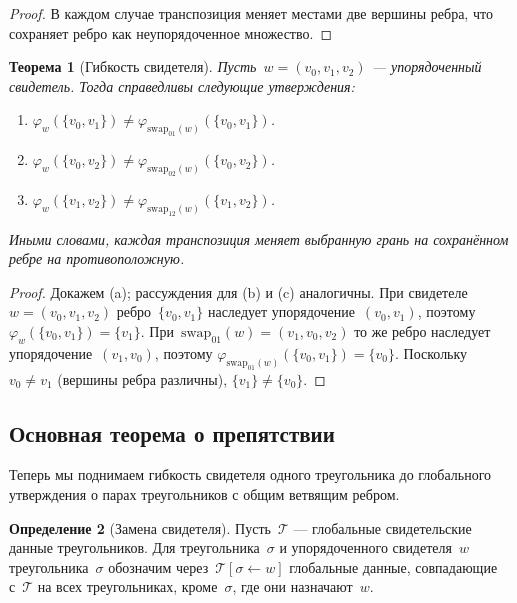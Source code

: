 \documentclass[11pt,a4paper]{article}
\theoremstyle{plain}
\newtheorem{theorem}{Теорема}[section]
\theoremstyle{definition}
\newtheorem{definition}[theorem]{Определение}
\theoremstyle{remark}
\newcommand{\cT}{\mathcal{T}}
\newcommand{\swapAB}{\mathrm{swap}_{01}}
\newcommand{\swapAC}{\mathrm{swap}_{02}}
\newcommand{\swapBC}{\mathrm{swap}_{12}}
\newcommand{\chosenface}{\varphi}
\begin{document}
\begin{proof}
В каждом случае транспозиция меняет местами две вершины ребра, что
сохраняет ребро как неупорядоченное множество.
\end{proof}

\begin{theorem}[Гибкость свидетеля]
\label{thm:flexibility}
Пусть~$w = (v_0, v_1, v_2)$ --- упорядоченный свидетель. Тогда
справедливы следующие утверждения:
\begin{enumerate}[label=\textup{(\alph*)},nosep]
  \item $\chosenface_w(\{v_0, v_1\}) \neq
        \chosenface_{\swapAB(w)}(\{v_0, v_1\})$.
  \item $\chosenface_w(\{v_0, v_2\}) \neq
        \chosenface_{\swapAC(w)}(\{v_0, v_2\})$.
  \item $\chosenface_w(\{v_1, v_2\}) \neq
        \chosenface_{\swapBC(w)}(\{v_1, v_2\})$.
\end{enumerate}
Иными словами, каждая транспозиция меняет выбранную грань на сохранённом
ребре на противоположную.
\end{theorem}

\begin{proof}
Докажем (a); рассуждения для (b) и (c) аналогичны.
При свидетеле~$w = (v_0, v_1, v_2)$ ребро~$\{v_0, v_1\}$ наследует
упорядочение~$(v_0, v_1)$, поэтому
$\chosenface_w(\{v_0, v_1\}) = \{v_1\}$.
При~$\swapAB(w) = (v_1, v_0, v_2)$ то же ребро наследует
упорядочение~$(v_1, v_0)$, поэтому
$\chosenface_{\swapAB(w)}(\{v_0, v_1\}) = \{v_0\}$.
Поскольку~$v_0 \neq v_1$ (вершины ребра различны),
$\{v_1\} \neq \{v_0\}$.
\end{proof}

\subsection{Основная теорема о препятствии}
\label{sec:main-theorem}

Теперь мы поднимаем гибкость свидетеля одного треугольника до глобального
утверждения о парах треугольников с общим ветвящим ребром.

\begin{definition}[Замена свидетеля]
\label{def:replacement}
Пусть~$\cT$ --- глобальные свидетельские данные треугольников. Для
треугольника~$\sigma$ и упорядоченного свидетеля~$w$
треугольника~$\sigma$ обозначим через~$\cT[\sigma \leftarrow w]$
глобальные данные, совпадающие с~$\cT$ на всех треугольниках,
кроме~$\sigma$, где они назначают~$w$.
\end{definition}
\end{document}
